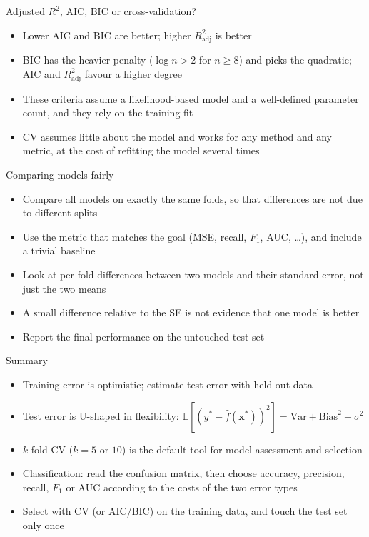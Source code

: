 \begin{frame}{Adjusted $R^2$, AIC, BIC or cross-validation?}
    \begin{itemize}
        \item Lower AIC and BIC are better; higher $R^2_{\text{adj}}$ is better
        \item BIC has the heavier penalty ($\log n > 2$ for $n \geq 8$) and picks the quadratic; AIC and $R^2_{\text{adj}}$ favour a higher degree
        \item These criteria assume a likelihood-based model and a well-defined parameter count, and they rely on the training fit
        \item CV assumes little about the model and works for any method and any metric, at the cost of refitting the model several times
    \end{itemize}
\end{frame}


\begin{frame}{Comparing models fairly}
    \begin{itemize}
        \item Compare all models on exactly the same folds, so that differences are not due to different splits
        \item Use the metric that matches the goal (MSE, recall, $F_1$, AUC, \dots), and include a trivial baseline
        \item Look at per-fold differences between two models and their standard error, not just the two means
        \item A small difference relative to the SE is not evidence that one model is better
        \item Report the final performance on the untouched test set
    \end{itemize}
\end{frame}


\begin{frame}{Summary}
    \begin{itemize}
        \item Training error is optimistic; estimate test error with held-out data
        \item Test error is U-shaped in flexibility: $\mathbb{E}[(y^\ast - \hat{f}(\mathbf{x}^\ast))^2] = \mathrm{Var} + \mathrm{Bias}^2 + \sigma^2$
        \item $k$-fold CV ($k = 5$ or $10$) is the default tool for model assessment and selection
        \item Classification: read the confusion matrix, then choose accuracy, precision, recall, $F_1$ or AUC according to the costs of the two error types
        \item Select with CV (or AIC/BIC) on the training data, and touch the test set only once
    \end{itemize}
\end{frame}
